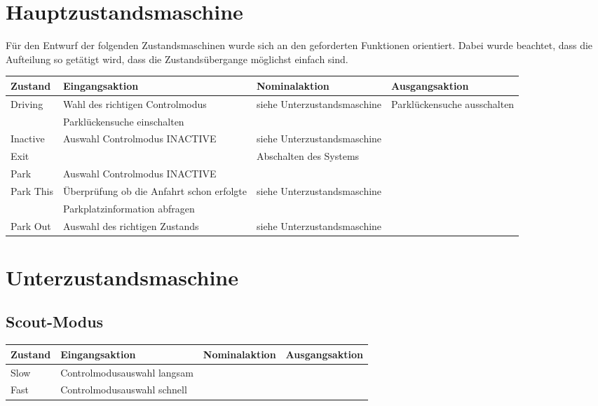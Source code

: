 \section{Hauptzustandsmaschine}

Für den Entwurf der folgenden Zustandsmaschinen wurde sich an den geforderten Funktionen orientiert. Dabei wurde beachtet, dass die Aufteilung so getätigt wird, dass die Zustandsübergange möglichst einfach sind.\\

\noindent \begin{tabular}{|p{1.5cm}|p{4cm}|p{3.8cm}|p{3cm}|}
	\hline 
	Zustand & Eingangsaktion & Nominalaktion & Ausgangsaktion \\ 
	\hline 
	Driving & Wahl des richtigen Controlmodus & siehe Unterzustandsmaschine & Parklückensuche ausschalten \\ 
	\hline 
	 & Parklückensuche einschalten &  &  \\ 
	\hline
	Inactive & Auswahl Controlmodus INACTIVE & siehe Unterzustandsmaschine &  \\ 
	\hline 
	Exit &  & Abschalten des Systems &  \\ 
	\hline
	Park & Auswahl Controlmodus INACTIVE &  &  \\ 
	\hline
	Park This & Überprüfung ob die Anfahrt schon erfolgte & siehe Unterzustandsmaschine &  \\ 
	\hline
	 & Parkplatzinformation abfragen &  &  \\ 
	\hline
	Park Out & Auswahl des richtigen Zustands & siehe Unterzustandsmaschine &  \\ 
	\hline 	
\end{tabular} 


\section{Unterzustandsmaschine}

\subsection{Scout-Modus}

\begin{tabular}{|p{1.5cm}|p{4cm}|p{4cm}|p{3cm}|}
	\hline 
	Zustand & Eingangsaktion & Nominalaktion & Ausgangsaktion \\ 
	\hline 
	Slow & Controlmodusauswahl langsam &  &  \\ 
	\hline 
	Fast & Controlmodusauswahl schnell &  &  \\ 
	\hline 
\end{tabular} 

